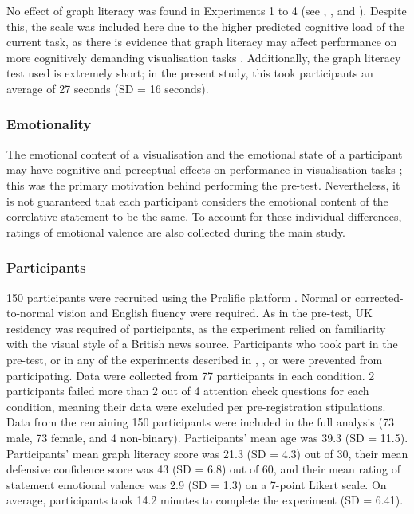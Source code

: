 \documentclass[../main.tex]{subfiles}
\begin{document}
No effect of graph literacy was found in Experiments 1 to 4 (see
, , and
). Despite this, the scale was
included here due to the higher predicted cognitive load of the current
task, as there is evidence that graph literacy may affect performance on
more cognitively demanding visualisation tasks
\cite{canham_2010, okan_2012}. Additionally, the graph literacy test
used \cite{garcia_2016} is extremely short; in the present study, this
took participants an average of 27 seconds (SD = 16 seconds).

\subsubsection{Emotionality}\label{emotionality}

The emotional content of a visualisation and the emotional state of a
participant may have cognitive and perceptual effects on performance in
visualisation tasks \cite{phelps_2006, harrison_2013, thoresen_2016};
this was the primary motivation behind performing the pre-test.
Nevertheless, it is not guaranteed that each participant considers the
emotional content of the correlative statement to be the same. To
account for these individual differences, ratings of emotional valence
are also collected during the main study.

\subsubsection{Participants}\label{participants-e5}

150 participants were recruited using the Prolific platform
\cite{prolific}. Normal or corrected-to-normal vision and English
fluency were required. As in the pre-test, UK residency was required of
participants, as the experiment relied on familiarity with the visual
style of a British news source. Participants who took part in the
pre-test, or in any of the experiments described in
, , or
 were prevented from participating.
Data were collected from 77 participants in each condition. 2
participants failed more than 2 out of 4 attention check questions for
each condition, meaning their data were excluded per pre-registration
stipulations. Data from the remaining 150 participants were included in
the full analysis (73 male, 73 female, and 4 non-binary). Participants'
mean age was 39.3 (SD = 11.5). Participants' mean graph literacy score
was 21.3 (SD = 4.3) out of 30, their mean defensive confidence score was
43 (SD = 6.8) out of 60, and their mean rating of statement emotional
valence was 2.9 (SD = 1.3) on a 7-point Likert scale. On average,
participants took 14.2 minutes to complete the experiment (SD = 6.41).
\end{document}
